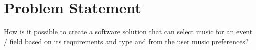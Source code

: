 \chapter{Problem Statement}

How is it possible to create a software solution that can select music for an event / field based on its requirements and type and from the user music preferences?